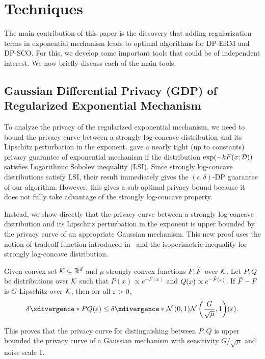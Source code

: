 \section{Techniques}

The main contribution of this paper is the discovery that adding regularization terms in exponential mechanism leads to optimal algorithms for DP-ERM and DP-SCO. For this, we develop some important tools that could be of independent interest. We now briefly discuss each of the main tools.


\subsection{Gaussian Differential Privacy (GDP) of Regularized Exponential Mechanism}

To analyze the privacy of the regularized exponential mechanism, we need to bound the privacy curve between a strongly log-concave distribution and its Lipschitz perturbation in the exponent. \cite{MASN16} gave a nearly tight (up to constants) privacy guarantee of exponential mechanism if the distribution $\exp(-k F(x;\mathcal D))$ satisfies Logarithmic Sobolev inequality (LSI). Since strongly log-concave distributions satisfy LSI, their result immediately gives the $(\epsilon,\delta)$-DP guarantee of our algorithm. However, this gives a sub-optimal privacy bound because it does not fully take advantage of the strongly log-concave property.

Instead, we show directly that the privacy curve between a strongly log-concave distribution and its Lipschitz perturbation in the exponent is upper bounded by the privacy curve of an appropriate Gaussian mechanism. This new proof uses the notion of tradeoff function introduced in~\cite{dong2019gaussian} and the isoperimetric inequality for strongly log-concave distribution.

\begin{theorem}
\label{thm:privacy_technical}
Given convex set $\mathcal K\subseteq \mathbb{R}^d$ and $\mu$-strongly convex functions $F,\Tilde{F}$ over $\mathcal K$. Let $P,Q$ be distributions over $\mathcal K$ such that $P(x)\propto e^{-F(x)}$ and $Q(x)\propto e^{-\Tilde{F}(x)}$.
If $\Tilde{F}-F$ is $G$-Lipschitz over $\mathcal K$, then for all $\varepsilon>0$,
\begin{align*}
    \deltacurve{P}{Q}(\epsilon) 
    \leq \deltacurve{\cN\lp 0,1\rp}{\cN\lp\frac{G}{\sqrt{\mu}},1\rp}(\epsilon).
\end{align*}
\end{theorem}
This proves that the privacy curve for distinguishing between $P,Q$ is upper bounded the privacy curve of a Gaussian mechanism with sensitivity $G/\sqrt{\mu}$ and noise scale 1.


